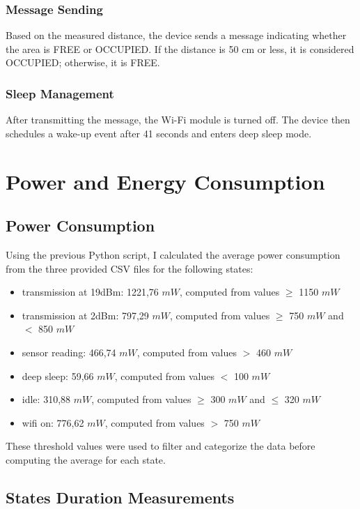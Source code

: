 \documentclass{Configuration_Files/PoliMi3i_thesis}
\begin{document}
\subsection{Message Sending}
Based on the measured distance, the device sends a message indicating whether the area is FREE or OCCUPIED. If the distance is 50 cm or less, it is considered OCCUPIED; otherwise, it is FREE.
\subsection{Sleep Management}
After transmitting the message, the Wi-Fi module is turned off. The device then schedules a wake-up event after 41 seconds and enters deep sleep mode.

\chapter{Power and Energy Consumption}
\label{ch:power_and_energy_consumptioin}%
\section{Power Consumption}


Using the previous Python script, I calculated the average power consumption from the three provided CSV files for the following states:  

\begin{itemize}
    \item transmission at 19dBm: 1221,76 $mW$, computed from values $\ge$ 1150 $mW$
    \item transmission at 2dBm: 797,29 $mW$, computed from values $\ge$ 750 $mW$ and $<$ 850 $mW$
    \item sensor reading: 466,74 $mW$, computed from values $>$ 460 $mW$
   \item deep sleep: 59,66 $mW$, computed from values $<$ 100 $mW$
   \item idle: 310,88 $mW$, computed from values $\ge$ 300 $mW$ and $\le$ 320 $mW$
   \item wifi on: 776,62 $mW$, computed from values $>$ 750 $mW$
\end{itemize}

These threshold values were used to filter and categorize the data before computing the average for each state.

\newpage
\section{States Duration Measurements}
\end{document}
